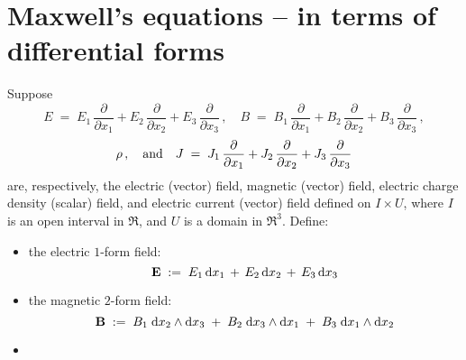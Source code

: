 

\section{Maxwell's equations -- in terms of differential forms}
\setcounter{theorem}{0}
\setcounter{equation}{0}


\renewcommand{\theenumi}{\roman{enumi}}
\renewcommand{\labelenumi}{\textnormal{(\theenumi)}$\;\;$}


\begin{theorem}
\mbox{}
\vskip 0.2cm
\noindent
Suppose
\begin{equation*}
E \; = \; E_{1}\,\dfrac{\partial}{\partial x_{1}} + E_{2}\,\dfrac{\partial}{\partial x_{2}} + E_{3}\,\dfrac{\partial}{\partial x_{3}}\,,
\quad
B \; = \; B_{1}\,\dfrac{\partial}{\partial x_{1}} + B_{2}\,\dfrac{\partial}{\partial x_{2}} + B_{3}\,\dfrac{\partial}{\partial x_{3}}\,,
\end{equation*}
\begin{equation*}
\rho\,,
\quad\textnormal{and}\quad
J \; = \; J_{1}\,\dfrac{\partial}{\partial x_{1}} + J_{2}\,\dfrac{\partial}{\partial x_{2}} + J_{3}\,\dfrac{\partial}{\partial x_{3}}
\end{equation*}
are, respectively, the electric (vector) field, magnetic (vector) field,
electric charge density (scalar) field, and electric current (vector) field
defined on $I \times U$,
where $I$ is an open interval in $\Re$, and $U$ is a domain in $\Re^{3}$.
\vskip 0.3cm
\noindent
Define:
\begin{itemize}
\item
	the electric $1$-form field:
	\begin{equation*}
	\mathbf{E} \; := \; E_{1}\,\textnormal{d} x_{1} \,+\, E_{2}\,\textnormal{d} x_{2} \,+\, E_{3}\,\textnormal{d} x_{3}
	\end{equation*}
\item
	the magnetic $2$-form field:
	\begin{equation*}
	\mathbf{B}
	\; := \;
		B_{1}\;\textnormal{d} x_{2} \wedge \textnormal{d} x_{3}
		\;+\;
		B_{2}\;\textnormal{d} x_{3} \wedge \textnormal{d} x_{1}
		\;+\;
		B_{3}\;\textnormal{d} x_{1} \wedge \textnormal{d} x_{2}
	\end{equation*}
\item

\end{itemize}
\end{theorem}
